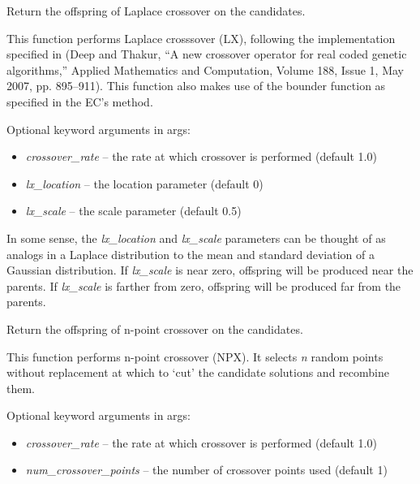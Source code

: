 \documentclass[letterpaper,10pt,english]{sphinxmanual}
\begin{document}

\begin{fulllineitems}
\label{reference:inspyred.ec.variators.laplace_crossover}
Return the offspring of Laplace crossover on the candidates.

This function performs Laplace crosssover (LX), following the 
implementation specified in (Deep and Thakur, ``A new crossover 
operator for real coded genetic algorithms,'' Applied Mathematics 
and Computation, Volume 188, Issue 1, May 2007, pp. 895--911).
This function also makes use of the bounder function as specified 
in the EC's  method.

Optional keyword arguments in args:
\begin{itemize}
\item {} 
\emph{crossover\_rate} -- the rate at which crossover is performed 
(default 1.0)

\item {} 
\emph{lx\_location} -- the location parameter (default 0)

\item {} 
\emph{lx\_scale} -- the scale parameter (default 0.5)

\end{itemize}

In some sense, the \emph{lx\_location} and \emph{lx\_scale} parameters can be thought 
of as analogs in a Laplace distribution to the mean and standard 
deviation of a Gaussian distribution. If \emph{lx\_scale} is near zero, offspring 
will be produced near the parents. If \emph{lx\_scale} is farther from zero, 
offspring will be produced far from the parents.

\end{fulllineitems}


\begin{fulllineitems}
\label{reference:inspyred.ec.variators.n_point_crossover}
Return the offspring of n-point crossover on the candidates.

This function performs n-point crossover (NPX). It selects \emph{n} 
random points without replacement at which to `cut' the candidate 
solutions and recombine them.

Optional keyword arguments in args:
\begin{itemize}
\item {} 
\emph{crossover\_rate} -- the rate at which crossover is performed 
(default 1.0)

\item {} 
\emph{num\_crossover\_points} -- the number of crossover points used (default 1)

\end{itemize}

\end{fulllineitems}
\end{document}
